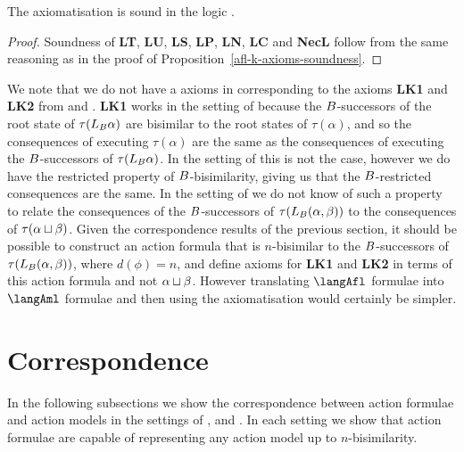 \begin{proposition}\label{afl-s-axioms-soundness}
    The axiomatisation \axiomAflS{} is sound in the logic \logicAmlS{}.
\end{proposition}

\begin{proof}
    Soundness of {\bf LT}, {\bf LU}, {\bf LS}, {\bf LP}, {\bf LN}, {\bf LC} and {\bf NecL} follow from the same reasoning as in the proof of Proposition~\ref{afl-k-axioms-soundness}.
\end{proof}

We note that we do not have a axioms in \logicAflS{} corresponding to the axioms {\bf LK1} and {\bf LK2} from \axiomAflK{} and \axiomAflKFF{}.
{\bf LK1} works in the setting of \classK{} because the $B$-successors of the root state of $\tau(L_B \alpha)$ are bisimilar to the root states of $\tau(\alpha)$, and so the consequences of executing $\tau(\alpha)$ are the same as the consequences of executing the $B$-successors of $\tau(L_B \alpha)$.
In the setting of \classKFF{} this is not the case, however we do have the restricted property of $B$-bisimilarity, giving us that the $B$-restricted consequences are the same.
In the setting of \classS{} we do not know of such a property to relate the consequences of the $B$-successors of $\tau(L_B (\alpha, \beta))$ to the consequences of $\tau(\alpha \sqcup \beta)$.
Given the correspondence results of the previous section, it should be possible to construct an action formula that is $n$-bisimilar to the $B$-successors of $\tau(L_B (\alpha, \beta))$, where $d(\phi) = n$, and define axioms for {\bf LK1} and {\bf LK2} in terms of this action formula and not $\alpha \sqcup \beta$.
However translating $\langAfl$ formulae into $\langAml$ formulae and then using the axiomatisation \axiomAmlS{} would certainly be simpler.

\section{Correspondence}\label{correspondence}

In the following subsections we show the correspondence between action formulae and action models in the settings of \classK{}, \classKFF{} and \classS{}.
In each setting we show that action formulae are capable of representing any action model up to $n$-bisimilarity.

\subsection{\classK{}}

